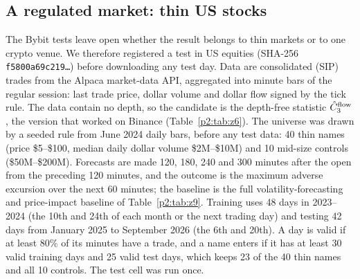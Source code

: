 \subsection{A regulated market: thin US stocks}\label{p2:sec:us}
The Bybit tests leave open whether the result belongs to thin markets or to one crypto venue. We therefore registered a test in US equities (SHA-256 \texttt{f5800a69c219\ldots}) before downloading any test day. Data are consolidated (SIP) trades from the Alpaca market-data API, aggregated into minute bars of the regular session: last trade price, dollar volume and dollar flow signed by the tick rule. The data contain no depth, so the candidate is the depth-free statistic $\hat C_3^{\rm flow}$, the version that worked on Binance (Table~\ref{p2:tab:z6}). The universe was drawn by a seeded rule from June 2024 daily bars, before any test data: 40 thin names (price \$5--\$100, median daily dollar volume \$2M--\$10M) and 10 mid-size controls (\$50M--\$200M). Forecasts are made 120, 180, 240 and 300 minutes after the open from the preceding 120 minutes, and the outcome is the maximum adverse excursion over the next 60 minutes; the baseline is the full volatility-forecasting and price-impact baseline of Table~\ref{p2:tab:z9}. Training uses 48 days in 2023--2024 (the 10th and 24th of each month or the next trading day) and testing 42 days from January 2025 to September 2026 (the 6th and 20th). A day is valid if at least 80\% of its minutes have a trade, and a name enters if it has at least 30 valid training days and 25 valid test days, which keeps 23 of the 40 thin names and all 10 controls. The test cell was run once.

